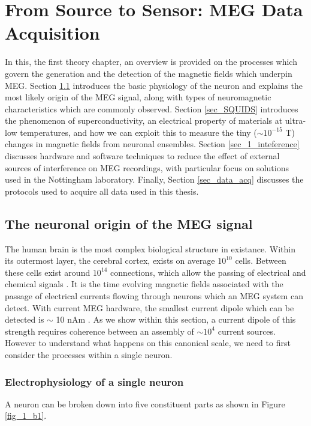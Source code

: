 \chapter{From Source to Sensor: MEG Data Acquisition}

In this, the first theory chapter, an overview is provided on the processes which govern the generation and the detection of the magnetic fields which underpin MEG. Section \ref{sec_1_neuro} introduces the basic physiology of the neuron and explains the most likely origin of the MEG signal, along with types of neuromagnetic characteristics which are commonly observed. Section \ref{sec_SQUIDS} introduces the phenomenon of superconductivity, an electrical property of materials at ultra-low temperatures, and how we can exploit this to measure the tiny ($\sim10^{-15}$ T) changes in magnetic fields from neuronal ensembles. Section \ref{sec_1_inteference} discusses hardware and software techniques to reduce the effect of external sources of interference on MEG recordings, with particular focus on solutions used in the Nottingham laboratory.  Finally, Section \ref{sec_data_acq} discusses the protocols used to acquire all data used in this thesis. 

\doublespacing
\section{The neuronal origin of the MEG signal}\label{sec_1_neuro}

The human brain is the most complex biological structure in existance. Within its outermost layer, the cerebral cortex, exists on average $10^{10}$ cells. Between these cells exist around $10^{14}$ connections, which allow the passing of electrical and chemical signals \citep{Bear1996}. It is the time evolving magnetic fields associated with the passage of electrical currents flowing through neurons which an MEG system can detect. With current MEG hardware, the smallest current dipole which can be detected is $\sim$ 10 nAm \citep{Hamalainen1993}. As we show within this section, a current dipole of this strength requires coherence between an assembly of $\sim10^4$ current sources. However to understand what happens on this canonical scale, we need to first consider the processes within a single neuron.

\subsection{Electrophysiology of a single neuron}
A neuron can be broken down into five constituent parts as shown in Figure \ref{fig_1_b1}. 

